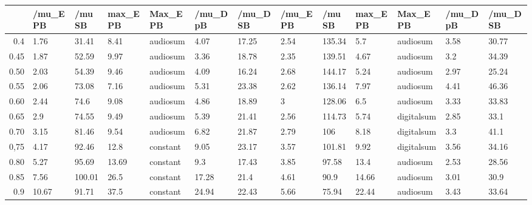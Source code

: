 \begin{table}[ht]
\centering
\begin{tabular}{rllllllllllll}
  \hline
 & /mu\_E PB & /mu SB & max\_E PB & Max\_E PB & /mu\_D pB & /mu\_D SB & /mu\_E PB & /mu SB & max\_E PB & Max\_E PB & /mu\_D pB & /mu\_D SB \\ 
  \hline
0.4 & 1.76 & 31.41 & 8.41 & audiosum & 4.07 & 17.25 & 2.54 & 135.34 & 5.7 & audiosum & 3.58 & 30.77 \\ 
  0.45 & 1.87 & 52.59 & 9.97 & audiosum & 3.36 & 18.78 & 2.35 & 139.51 & 4.67 & audiosum & 3.2 & 34.39 \\ 
  0.50 & 2.03 & 54.39 & 9.46 & audiosum & 4.09 & 16.24 & 2.68 & 144.17 & 5.24 & audiosum & 2.97 & 25.24 \\ 
  0.55 & 2.06 & 73.08 & 7.16 & audiosum & 5.31 & 23.38 & 2.62 & 136.14 & 7.97 & audiosum & 4.41 & 46.36 \\ 
  0.60 & 2.44 & 74.6 & 9.08 & audiosum & 4.86 & 18.89 & 3 & 128.06 & 6.5 & audiosum & 3.33 & 33.83 \\ 
  0.65 & 2.9 & 74.55 & 9.49 & audiosum & 5.39 & 21.41 & 2.56 & 114.73 & 5.74 & digitalsum & 2.85 & 33.1 \\ 
  0.70 & 3.15 & 81.46 & 9.54 & audiosum & 6.82 & 21.87 & 2.79 & 106 & 8.18 & digitalsum & 3.3 & 41.1 \\ 
  0,75 & 4.17 & 92.46 & 12.8 & constant & 9.05 & 23.17 & 3.57 & 101.81 & 9.92 & digitalsum & 3.56 & 34.16 \\ 
  0.80 & 5.27 & 95.69 & 13.69 & constant & 9.3 & 17.43 & 3.85 & 97.58 & 13.4 & audiosum & 2.53 & 28.56 \\ 
  0.85 & 7.56 & 100.01 & 26.5 & constant & 17.28 & 21.4 & 4.61 & 90.9 & 14.66 & audiosum & 3.01 & 30.9 \\ 
  0.9 & 10.67 & 91.71 & 37.5 & constant & 24.94 & 22.43 & 5.66 & 75.94 & 22.44 & audiosum & 3.43 & 33.64 \\ 
   \hline
\end{tabular}
\end{table}

